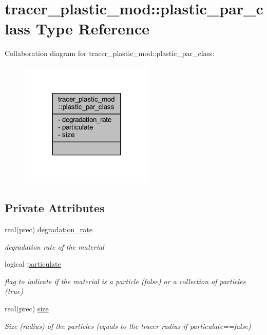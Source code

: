 \hypertarget{structtracer__plastic__mod_1_1plastic__par__class}{}\section{tracer\+\_\+plastic\+\_\+mod\+:\+:plastic\+\_\+par\+\_\+class Type Reference}
\label{structtracer__plastic__mod_1_1plastic__par__class}


Collaboration diagram for tracer\+\_\+plastic\+\_\+mod\+:\+:plastic\+\_\+par\+\_\+class\+:\nopagebreak
\begin{figure}[H]
\begin{center}
\leavevmode
\includegraphics[width=179pt]{structtracer__plastic__mod_1_1plastic__par__class__coll__graph}
\end{center}
\end{figure}
\subsection*{Private Attributes}
\begin{DoxyCompactItemize}
\item 
real(prec) \mbox{\hyperlink{structtracer__plastic__mod_1_1plastic__par__class_ae693d6112d2600408a274273d53c397e}{degradation\+\_\+rate}}
\begin{DoxyCompactList}\small\item\em degradation rate of the material \end{DoxyCompactList}\item 
logical \mbox{\hyperlink{structtracer__plastic__mod_1_1plastic__par__class_afbec8826947883ba3d3c5bc29759a80c}{particulate}}
\begin{DoxyCompactList}\small\item\em flag to indicate if the material is a particle (false) or a collection of particles (true) \end{DoxyCompactList}\item 
real(prec) \mbox{\hyperlink{structtracer__plastic__mod_1_1plastic__par__class_a4436f491c11ebd046b3a74987ff71eee}{size}}
\begin{DoxyCompactList}\small\item\em Size (radius) of the particles (equals to the tracer radius if particulate==false) \end{DoxyCompactList}\end{DoxyCompactItemize}


